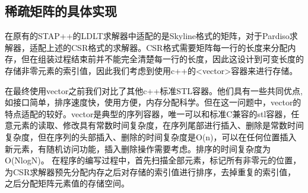 \documentclass[forprint]{WHUBachelor}
\begin{document}
\subsection{稀疏矩阵的具体实现}
在原有的STAP++的LDLT求解器中适配的是Skyline格式的矩阵，对于Pardiso求解器，适配上述的CSR格式的求解器。CSR格式需要矩阵每一行的长度来分配内存，但在组装过程结束前并不能完全清楚每一行的长度，因此这设计到可变长度的存储非零元素的索引值，因此我们考虑到使用c++的<vector>容器来进行存储。\par
在最终使用vector之前我们对比了其他c++标准STL容器。他们具有一些共同优点,如接口简单，排序速度快，使用方便，内存分配科学。但在这一问题中，vector的特点适配的较好。vector是典型的序列容器，唯一可以和标准C兼容的stl容器，任意元素的读取、修改具有常数时间复杂度，在序列尾部进行插入、删除是常数时间复杂度，但在序列的头部插入、删除的时间复杂度是O(n)，可以在任何位置插入新元素，有随机访问功能，插入删除操作需要考虑。排序的时间复杂度为O(NlogN)。
在程序的编写过程中，首先扫描全部元素，标记所有非零元的位置，为CSR求解器预先分配内存之后对存储的索引值进行排序，去掉重复的索引值，之后分配矩阵元素值的存储空间。
\end{document}
